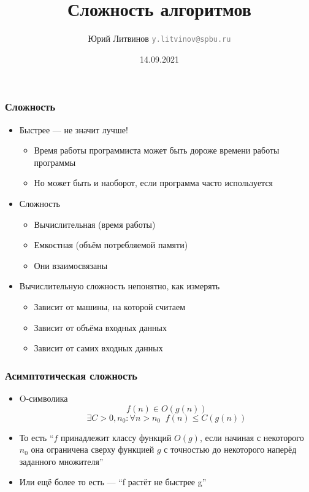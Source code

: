 \documentclass[xetex,mathserif,serif]{beamer}
\title{Сложность алгоритмов}
\author[Юрий Литвинов]{Юрий Литвинов \newline \textcolor{gray}{\small\texttt{y.litvinov@spbu.ru}}}
\date{14.09.2021}
\begin{document}
    
    \frame{\titlepage}
    
    \begin{frame}
        \frametitle{Сложность}
        \begin{itemize}
            \item Быстрее --- не значит лучше!
            \begin{itemize}
                \item Время работы программиста может быть дороже времени работы программы
                \item Но может быть и наоборот, если программа часто используется
            \end{itemize}
            \item Сложность
            \begin{itemize}
                \item Вычислительная (время работы)
                \item Емкостная (объём потребляемой памяти)
                \item Они взаимосвязаны
            \end{itemize}
            \item Вычислительную сложность непонятно, как измерять
            \begin{itemize}
                \item Зависит от машины, на которой считаем
                \item Зависит от объёма входных данных
                \item Зависит от самих входных данных
            \end{itemize}
        \end{itemize}
    \end{frame}

    \begin{frame}
        \frametitle{Асимптотическая сложность}
        \begin{itemize}
            \item O-символика
            $$f(n) \in O(g(n))$$
            $$\exists C > 0, n_0 : \forall n > n_0\;\; f(n) \leq C(g(n))$$
            \item То есть ``$f$ принадлежит классу функций $O(g)$, если начиная с некоторого $n_0$ она ограничена сверху функцией $g$ с точностью до некоторого наперёд заданного множителя''
            \item Или ещё более то есть --- ``f растёт не быстрее g''
        \end{itemize}
    \end{frame}
\end{document}
